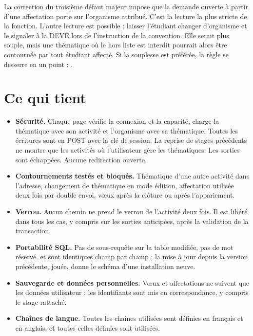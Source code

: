 \documentclass[11pt,a4paper]{article}
\begin{document}
La correction du troisième défaut majeur impose que la demande ouverte à partir d'une affectation
porte sur l'organisme attribué. C'est la lecture la plus stricte de la fonction. L'autre lecture
est possible : laisser l'étudiant changer d'organisme et le signaler à la DEVE lors de l'instruction
de la convention. Elle serait plus souple, mais une thématique où le hors liste est interdit
pourrait alors être contournée par tout étudiant affecté. Si la souplesse est préférée, la règle
se desserre en un point : .

\section{Ce qui tient}

\begin{itemize}
  \item \textbf{Sécurité.} Chaque page vérifie la connexion et la capacité, charge la thématique
    avec son activité et l'organisme avec sa thématique. Toutes les écritures sont en POST avec la
    clé de session. La reprise de stages précédents ne montre que les activités où l'utilisateur
    gère les thématiques. Les sorties sont échappées. Aucune redirection ouverte.
  \item \textbf{Contournements testés et bloqués.} Thématique d'une autre activité dans
    l'adresse, changement de thématique en mode édition, affectation utilisée deux fois par double
    envoi, vœux après la clôture ou après l'appariement.
  \item \textbf{Verrou.} Aucun chemin ne prend le verrou de l'activité deux fois. Il est libéré
    dans tous les cas, y compris sur les sorties anticipées, après la validation de la transaction.
  \item \textbf{Portabilité SQL.} Pas de sous-requête sur la table modifiée, pas de mot réservé.
     et  sont identiques champ par champ ; la mise à jour
    depuis la version précédente, jouée, donne le schéma d'une installation neuve.
  \item \textbf{Sauvegarde et données personnelles.} Vœux et affectations ne suivent que les
    données utilisateur ; les identifiants sont mis en correspondance, y compris le stage rattaché.
  \item \textbf{Chaînes de langue.} Toutes les chaînes utilisées sont définies en français et en
    anglais, et toutes celles définies sont utilisées.
\end{itemize}
\end{document}
